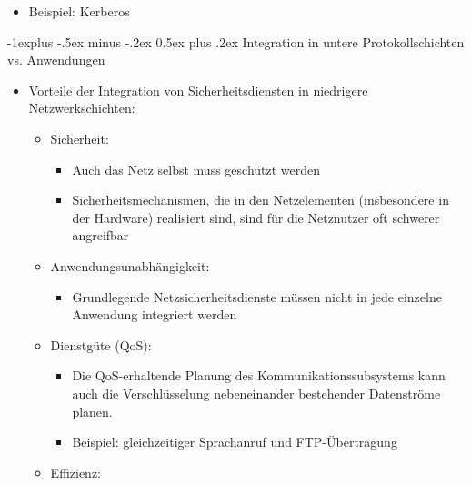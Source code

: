\documentclass[a4paper]{article}
\makeatletter
\renewcommand{\subsection}{\@startsection{subsection}{2}{0mm}%
 {-1explus -.5ex minus -.2ex}%
 {0.5ex plus .2ex}%
 {\normalfont\normalsize\bfseries}}
\makeatother
\begin{document}
\begin{multicols}{3}
\begin{itemize}
\begin{itemize}
                        \begin{itemize}
                            \item
                                  Beispiel: Kerberos
                        \end{itemize}
              \end{itemize}
    \end{itemize}


    \subsection{Integration in untere Protokollschichten vs.
        Anwendungen}

    \begin{itemize}
        \item
              Vorteile der Integration von Sicherheitsdiensten in niedrigere
              Netzwerkschichten:

              \begin{itemize}
                  \item
                        Sicherheit:

                        \begin{itemize}
                            \item
                                  Auch das Netz selbst muss geschützt werden
                            \item
                                  Sicherheitsmechanismen, die in den Netzelementen (insbesondere in
                                  der Hardware) realisiert sind, sind für die Netznutzer oft
                                  schwerer angreifbar
                        \end{itemize}
                  \item
                        Anwendungsunabhängigkeit:

                        \begin{itemize}
                            \item
                                  Grundlegende Netzsicherheitsdienste müssen nicht in jede einzelne
                                  Anwendung integriert werden
                        \end{itemize}
                  \item
                        Dienstgüte (QoS):

                        \begin{itemize}
                            \item
                                  Die QoS-erhaltende Planung des Kommunikationssubsystems kann auch
                                  die Verschlüsselung nebeneinander bestehender Datenströme planen.
                            \item
                                  Beispiel: gleichzeitiger Sprachanruf und FTP-Übertragung
                        \end{itemize}
                  \item
                        Effizienz:


\end{itemize}
\end{itemize}
\end{multicols}
\end{document}
